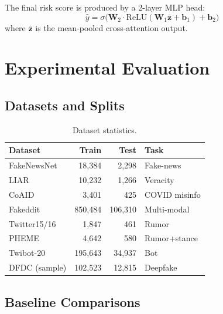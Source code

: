\documentclass[11pt,a4paper]{article}
\begin{document}
The final risk score is produced by a 2-layer MLP head:
\begin{equation}
  \hat{y} = \sigma\!\bigl(\mathbf{W}_2 \cdot \text{ReLU}(\mathbf{W}_1 \bar{\mathbf{z}} + \mathbf{b}_1) + \mathbf{b}_2\bigr)
\end{equation}
where $\bar{\mathbf{z}}$ is the mean-pooled cross-attention output.

\section{Experimental Evaluation}
\label{sec:experiments}

\subsection{Datasets and Splits}

\begin{table}[h]
\centering
\caption{Dataset statistics.}
\label{tab:datasets}
\begin{tabular}{lrrl}
\toprule
\textbf{Dataset} & \textbf{Train} & \textbf{Test} & \textbf{Task} \\
\midrule
FakeNewsNet & 18,384 & 2,298 & Fake-news \\
LIAR & 10,232 & 1,266 & Veracity \\
CoAID & 3,401 & 425 & COVID misinfo \\
Fakeddit & 850,484 & 106,310 & Multi-modal \\
Twitter15/16 & 1,847 & 461 & Rumor \\
PHEME & 4,642 & 580 & Rumor+stance \\
Twibot-20 & 195,643 & 34,937 & Bot \\
DFDC (sample) & 102,523 & 12,815 & Deepfake \\
\bottomrule
\end{tabular}
\end{table}

\subsection{Baseline Comparisons}
\end{document}
